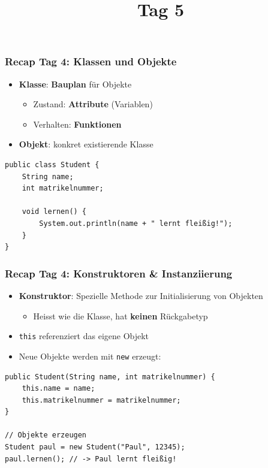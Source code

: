 \documentclass{../../presentation}
\title{\vkTitle\ Tag 5}
\author{\vkAuthors}
\institute{\vkInstitute}
\date{\vkDateDayFive}
\begin{document}
\begin{frame}
	\titlepage
\end{frame}

\begin{frame}[fragile]
	\frametitle{Recap Tag 4: Klassen und Objekte}
	\begin{itemize}
		\item \textbf{Klasse}: \textbf{Bauplan} für Objekte
		      \begin{itemize}
			      \item Zustand: \textbf{Attribute} (Variablen)
			      \item Verhalten: \textbf{Funktionen}
		      \end{itemize}
			  \pause
		\item \textbf{Objekt}: konkret existierende Klasse
	\end{itemize}
	\pause
	\begin{verbatim}
public class Student {
    String name;
    int matrikelnummer;

    void lernen() {
        System.out.println(name + " lernt fleißig!");
    }
}
	\end{verbatim}
\end{frame}

\begin{frame}[fragile]
	\frametitle{Recap Tag 4: Konstruktoren \& Instanziierung}
	\begin{itemize}
		\item \textbf{Konstruktor}: Spezielle Methode zur Initialisierung von Objekten
		
		      \begin{itemize}
			      \item Heisst wie die Klasse, hat \textbf{keinen} Rückgabetyp
		      \end{itemize}
		\pause
		\item \texttt{this} referenziert das eigene Objekt
		\pause
		\item Neue Objekte werden mit \texttt{new} erzeugt:
	\end{itemize}
	\pause
	\begin{verbatim}
public Student(String name, int matrikelnummer) {
    this.name = name;
    this.matrikelnummer = matrikelnummer;
}

// Objekte erzeugen
Student paul = new Student("Paul", 12345);
paul.lernen(); // -> Paul lernt fleißig!
	\end{verbatim}
\end{frame}
\end{document}
